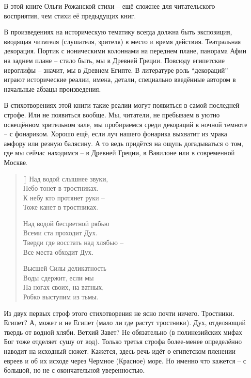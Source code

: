 \documentclass[12pt,a5paper,twoside]{article}
\begin{document}
В этой книге Ольги Рожанской стихи -- ещё сложнее для читательского восприятия, чем стихи её предыдущих книг.

В произведениях на историческую тематику всегда должна быть экспозиция, 
вводящая читателя (слушателя, зрителя) в место и время действия. Театральная декорация. 
Портик с ионическими колоннами на переднем плане, панорама Афин на заднем плане -- стало быть, 
мы в Древней Греции. Повсюду египетские иероглифы -- значит, мы в Древнем Египте. 
В литературе роль ``декораций'' играют исторические реалии, имена, детали, специально 
введённые автором в начальные абзацы произведения.

В стихотворениях этой книги такие реалии могут появиться в самой последней строфе. 
Или не появиться вообще.
Мы, читатели, не пребываем в уютно освещённом зрительном зале, 
мы пробираемся среди декораций в ночной темноте -- с фонариком. Хорошо ещё, 
если луч нашего фонарика выхватит из мрака амфору или резную балясину. 
А то ведь придётся на ощупь догадываться о том, где мы сейчас 
находимся -- в Древней Греции, в Вавилоне или в современной Москве.

\newpage
\settowidth{\versewidth}{Над водой слышнее звуки,}
\begin{verse}[\versewidth]
Над водой слышнее звуки, \\
Небо тонет в тростниках.\\
К небу кто протянет руки --\\
Тоже канет в тростниках.

Над водой бесцветной рябью\\
Всеми ста проходит Дух.\\
Тверди где восстать над хлябью --\\
Все места обходит Дух.

Высшей Силы деликатность\\
Воды сдержит, если мы\\
На ногах своих, на ватных,\\
Робко выступим из тьмы.
\end{verse}

Из двух первых строф этого стихотворения не ясно почти ничего. Тростники. Египет? 
А, может и не Египет (мало ли где растут тростники). Дух, отделяющий твердь от водной хляби. 
Ветхий Завет? Не обязательно (в полинезийских мифах Бог тоже отделяет сушу от вод). 
Только третья строфа более-менее определённо наводит на исходный сюжет. Кажется, 
здесь речь идёт о египетском пленении евреев и об их исходе через Чермное (Красное) море. 
Но именно что кажется -- с большой, но не с окончательной уверенностью.
\end{document}
